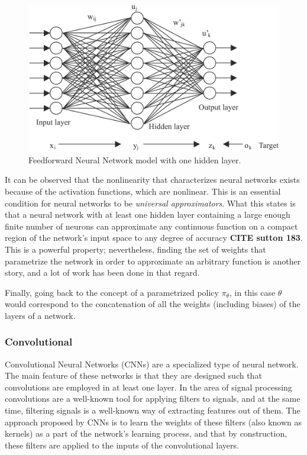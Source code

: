 \begin{figure}[H]
    \centering
    \includegraphics[width=0.6\linewidth]{imagenes/cap1/NeuralNetwork.png}
    \caption{Feedforward Neural Network model with one hidden layer.}
    \label{fig:FNN}
\end{figure}

It can be observed that the nonlinearity that characterizes neural networks exists because of the activation functions, which are nonlinear. This is an essential condition for neural networks to be \emph{universal approximators}. What this states is that a neural network with at least one hidden layer containing a large enough finite number of neurons can approximate any continuous function on a compact region of the network's input space to any degree of accuracy \textbf{CITE sutton 183}. This is a powerful property; nevertheless, finding the set of weights that parametrize the network in order to approximate an arbitrary function is another story, and a lot of work has been done in that regard. 

Finally, going back to the concept of a parametrized policy $\pi_{\theta}$, in this case $\theta$ would correspond to the concatenation of all the weights (including biases) of the layers of a network. \newline

\subsubsection{Convolutional}
    
Convolutional Neural Networks (CNNs) are a specialized type of neural network. The main feature of these networks is that they are designed such that convolutions are employed in at least one layer. In the area of signal processing convolutions are a well-known tool for applying filters to signals, and at the same time, filtering signals is a well-known way of extracting features out of them. The approach proposed by CNNs is to learn the weights of these filters (also known as kernels) as a part of the network's learning process, and that by construction, these filters are applied to the inputs of the convolutional layers.

